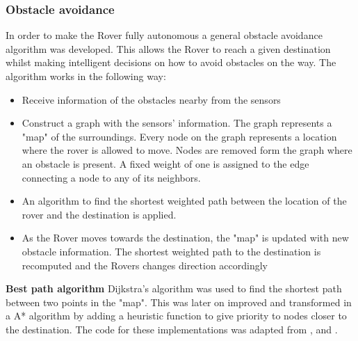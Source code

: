 \documentclass[10pt,twoside]{article}
\begin{document}
\subsubsection{Obstacle avoidance}
In order to make the Rover fully autonomous a general obstacle avoidance algorithm was developed. This allows the Rover to reach a given destination whilst making intelligent decisions on how to avoid obstacles on the way.
The algorithm works in the following way:
\begin{itemize}
    \item Receive information of the obstacles nearby from the sensors
    \item Construct a graph with the sensors' information. The graph represents a "map" of the surroundings. Every node on the graph represents a location where the rover is allowed to move. Nodes are removed form the graph where an obstacle is present. A fixed weight of one is assigned to the edge connecting a node to any of its neighbors.
    \item An algorithm to find the shortest weighted path between the location of the rover and the destination is applied.
    \item As the Rover moves towards the destination, the "map" is updated with new obstacle information. The shortest weighted path to the destination is recomputed and the Rovers changes direction accordingly
\end{itemize}

\textbf{Best path algorithm} Dijkstra's algorithm was used to find the shortest path between two points in the "map". This was later on improved and transformed in a A* algorithm by adding a heuristic function to give priority to nodes closer to the destination. The code for these implementations was adapted from \cite{AWikipedia},\cite{AAB} and \cite{ImplementationA}.
\end{document}
